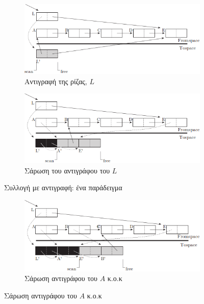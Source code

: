 \begin{greek}
\begin{figure}
  \begin{subfigure}[b]{1.0\textwidth}
    \includegraphics{figures/cop_1b}
    \caption{Αντιγραφή της ρίζας, $L$}
  \end{subfigure}
  
  \begin{subfigure}[b]{1.0\textwidth}
    \includegraphics{figures/cop_1c}
    \caption{Σάρωση του αντιγράφου του $L$}
  \end{subfigure}
  \caption{Συλλογή με αντιγραφή: ένα παράδειγμα}
  \label{fig:cop_1}
\end{figure}

\begin{figure}[H]
  \ContinuedFloat
  \centering
  \begin{subfigure}{1.0\textwidth}
    \includegraphics{figures/cop_2a}
    \caption{Σάρωση αντιγράφου του $Α$ κ.ο.κ}
  \end{subfigure}


\end{figure}
\end{greek}
